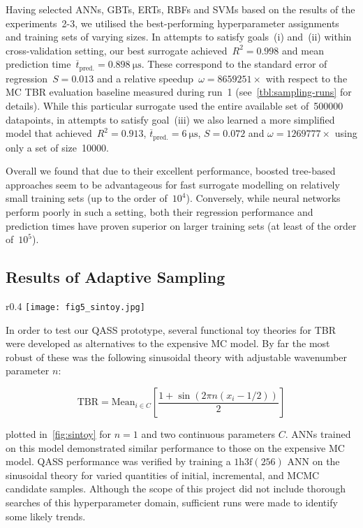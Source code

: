 Having selected ANNs, GBTs, ERTs, RBFs and SVMs based on the results of the
experiments~2-3, we utilised the best-performing hyperparameter
assignments and training sets of varying sizes. In attempts to satisfy
goals~(i) and~(ii) within cross-validation setting, our best surrogate
achieved~$R^2=\num{0.998}$ and mean prediction
time~$\overline{t}_{\text{pred.}}=\SI{0.898}{\micro\second}$. These correspond
to the standard error of regression~$S=\num{0.013}$ and a relative speedup~$\omega=\num{8659251} \times$
with respect to the MC TBR evaluation baseline measured during run~1
(see~\cref{tbl:sampling-runs} for details). While this particular surrogate
used the entire available set of~\num{500000} datapoints, in attempts to satisfy
goal~(iii) we also learned a more simplified model that achieved~$R^2=\num{0.913}$,
$\overline{t}_{\text{pred.}}=\SI{6}{\micro\second}$, $S=\num{0.072}$ and $\omega=\num{1269777} \times$
using only a set of size~\num{10000}.

Overall we found that due to their excellent performance, boosted tree-based
approaches seem to be advantageous for fast surrogate modelling on relatively small training
sets (up to the order of~$10^4$). Conversely, while neural networks perform
poorly in such a setting, both their regression performance and prediction times
have proven superior on larger training sets (at least of the order of~$10^5$).


\subsection{Results of Adaptive Sampling}
\label{sec:adaptiveres}

\begin{wrapfigure}{r}{0.4\textwidth}
	\centering
	\texttt{[image: fig5\_sintoy.jpg]}
	\caption{Sinusoidal toy TBR theory over two continuous parameters, wavenumber 1}
	\label{fig:sintoy}
\end{wrapfigure}

In order to test our QASS prototype, several functional toy theories for TBR were developed as alternatives to the expensive MC model. By far the most robust of these was the following sinusoidal theory with adjustable wavenumber parameter $n$:

\begin{equation}
	\text{TBR} = \text{Mean}_{i \in C} \left[ \frac{1 + \sin(2\pi n (x_i - 1/2)) }{2} \right]
\end{equation}

plotted in~\cref{fig:sintoy} for $n=1$ and two continuous parameters $C$. ANNs
trained on this model demonstrated similar performance to those on the expensive
MC model. QASS performance was verified by training a $\text{1h3f}(256)$ ANN on
the sinusoidal theory for varied quantities of initial, incremental, and MCMC
candidate samples. Although the scope of this project did not include thorough
searches of this hyperparameter domain, sufficient runs were made to identify
some likely trends.

